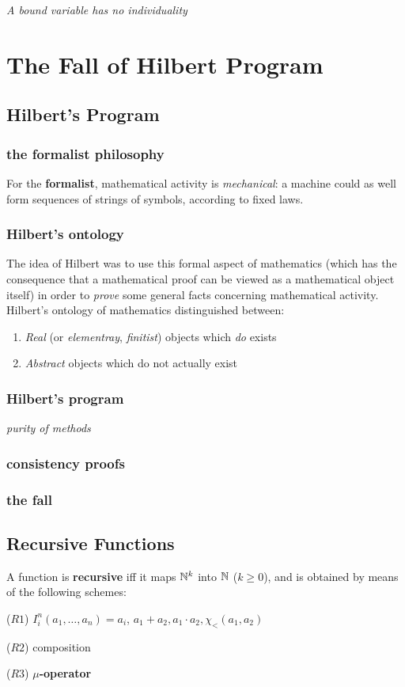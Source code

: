 \documentclass[11pt]{article}
\begin{document}
\emph{A bound variable has no individuality}
\section{The Fall of Hilbert Program}
\label{sec:orgd1daeed}
\subsection{Hilbert's Program}
\label{sec:org14bfe09}
\subsubsection{the formalist philosophy}
\label{sec:org529689e}
For the \textbf{formalist}, mathematical activity is \emph{mechanical}: a machine could as well
form sequences of strings of symbols, according to fixed laws.
\subsubsection{Hilbert's ontology}
\label{sec:orgf578d23}
The idea of Hilbert was to use this formal aspect of mathematics (which has the
consequence that a mathematical proof can be viewed as a mathematical object
itself) in order to \emph{prove} some general facts concerning mathematical activity.
Hilbert's ontology of mathematics distinguished between:
\begin{enumerate}
\item \emph{Real} (or \emph{elementray}, \emph{finitist}) objects which \emph{do} exists
\item \emph{Abstract} objects which do not actually exist
\end{enumerate}
\subsubsection{Hilbert's program}
\label{sec:org8a1a6a7}
\emph{purity of methods}
\subsubsection{consistency proofs}
\label{sec:org272de54}
\subsubsection{the fall}
\label{sec:org184ef5f}
\subsection{Recursive Functions}
\label{sec:orgb23199c}
\begin{definition}[]
A function is \textbf{recursive} iff it maps \(\mathbb{N}^k\) into \(\mathbb{N}\) (\(k\ge 0\)), and is obtained
by means of the following schemes:

(\(R1\)) \(I_i^n(a_1,\dots,a_n)=a_i\), \(a_1+a_2,a_1\cdot a_2,\chi_<(a_1,a_2)\)

(\(R2\)) composition

(\(R3\)) \textbf{\(\mu\)-operator}
\end{definition}
\end{document}
